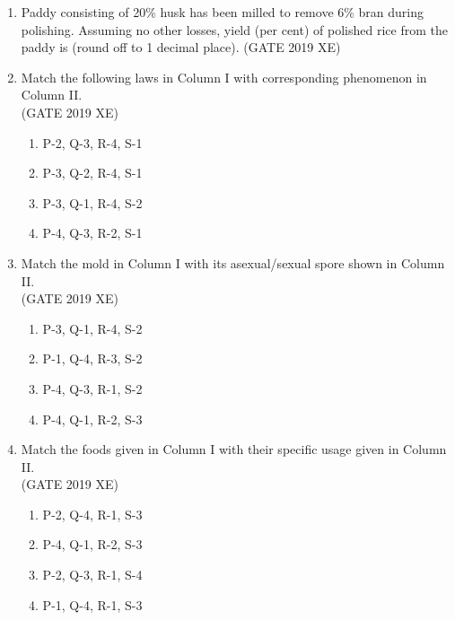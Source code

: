 \documentclass[journal,12pt,onecolumn]{IEEEtran}
\begin{document}
\begin{enumerate}
\item Paddy consisting of 20\% husk has been milled to remove 6\% bran during polishing. Assuming no other losses, yield (per cent) of polished rice from the paddy is \underline{\hspace{2cm}} (round off to 1 decimal place).
\hfill{(GATE 2019 XE)} \\


\item Match the following laws in Column I with corresponding phenomenon in Column II.\\



\hfill{(GATE 2019 XE)} \\
\begin{multicols}{2}
\begin{enumerate}
\item P-2, Q-3, R-4, S-1
\item P-3, Q-2, R-4, S-1
\item P-3, Q-1, R-4, S-2
\item P-4, Q-3, R-2, S-1
\end{enumerate}
\end{multicols}

\item Match the mold in Column I with its asexual/sexual spore shown in Column II.\\


\hfill{(GATE 2019 XE)} \\
\begin{multicols}{2}
\begin{enumerate}
\item P-3, Q-1, R-4, S-2
\item P-1, Q-4, R-3, S-2
\item P-4, Q-3, R-1, S-2
\item P-4, Q-1, R-2, S-3
\end{enumerate}
\end{multicols}

\item Match the foods given in Column I with their specific usage given in Column II.\\



\hfill{(GATE 2019 XE)} \\
\begin{multicols}{2}
\begin{enumerate}
\item P-2, Q-4, R-1, S-3
\item P-4, Q-1, R-2, S-3
\item P-2, Q-3, R-1, S-4
\item P-1, Q-4, R-1, S-3
\end{enumerate}
\end{multicols}


\end{enumerate}
\end{document}
